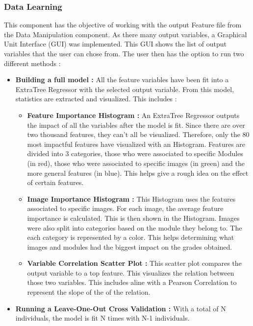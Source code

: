 \documentclass[a4paper,11pt]{report}
\numberwithin{figure}{section} %
\begin{document}
    \subsubsection{Data Learning}

    This component has the objective of working with the output Feature file from the Data Manipulation component.
    As there many output variables, a Graphical Unit Interface (GUI) was implemented.
    This GUI shows the list of output variables that the user can chose from.
    The user then has the option to run two different methods :
    \begin{itemize}
        \item[\textbullet] \textbf{Building a full model :} All the feature variables have been fit into a ExtraTree Regressor with the selected output variable.
        From this model, statistics are extracted and visualized.
        This includes :
        \begin{itemize}
            \item \textbf{Feature Importance Histogram :} An ExtraTree Regressor outputs the impact of all the variables after the model is fit.
            Since there are over two thousand features, they can't all be visualized.
            Therefore, only the 80 most impactful features have visualized with an Histogram.
            Features are divided into 3 categories, those who were associated to specific Modules (in red), those who were associated to specific images (in green) and the more general features (in blue).
            This helps give a rough idea on the effect of certain features.
            \item \textbf{Image Importance Histogram :} This Histogram uses the features associated to specific images.
            For each image, the average feature importance is calculated.
            This is then shown in the Histogram.
            Images were also split into categories based on the module they belong to.
            The each category is represented by a color.
            This helps determining what images and modules had the biggest impact on the grades obtained.
            \item \textbf{Variable Correlation Scatter Plot :} This scatter plot compares the output variable to a top feature.
            This visualizes the relation between those two variables.
            This includes aline with a Pearson Correlation to represent the slope of the of the relation.
        \end{itemize}
        \item \textbf{Running a Leave-One-Out Cross Validation :} With a total of N individuals, the model is fit N times with N-1 individuals.

\end{itemize}
\end{document}
